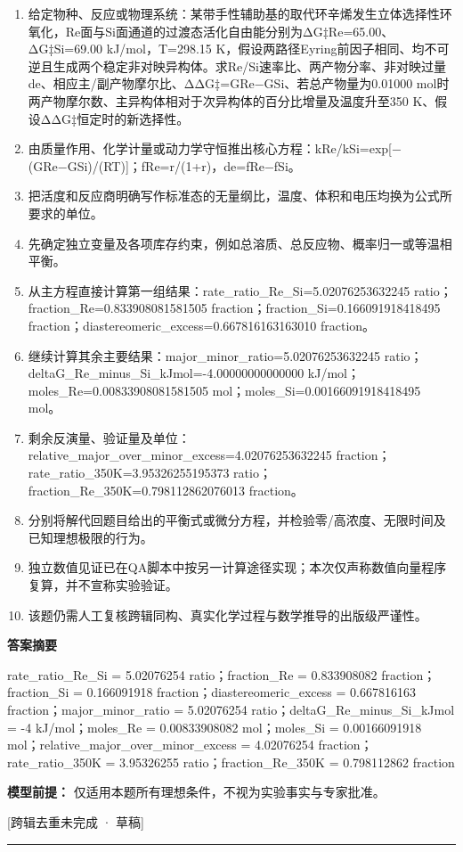 \documentclass[UTF8,11pt,a4paper]{ctexart}
\begin{document}
\begin{enumerate}
\item 给定物种、反应或物理系统：某带手性辅助基的取代环辛烯发生立体选择性环氧化，Re面与Si面通道的过渡态活化自由能分别为ΔG‡Re=65.00、ΔG‡Si=69.00 kJ/mol，T=298.15 K，假设两路径Eyring前因子相同、均不可逆且生成两个稳定非对映异构体。求Re/Si速率比、两产物分率、非对映过量de、相应主/副产物摩尔比、ΔΔG‡=GRe−GSi、若总产物量为0.01000 mol时两产物摩尔数、主异构体相对于次异构体的百分比增量及温度升至350 K、假设ΔΔG‡恒定时的新选择性。
\item 由质量作用、化学计量或动力学守恒推出核心方程：kRe/kSi=exp[−(GRe−GSi)/(RT)]；fRe=r/(1+r)，de=fRe−fSi。
\item 把活度和反应商明确写作标准态的无量纲比，温度、体积和电压均换为公式所要求的单位。
\item 先确定独立变量及各项库存约束，例如总溶质、总反应物、概率归一或等温相平衡。
\item 从主方程直接计算第一组结果：rate\_ratio\_Re\_Si=5.02076253632245 ratio；fraction\_Re=0.833908081581505 fraction；fraction\_Si=0.166091918418495 fraction；diastereomeric\_excess=0.667816163163010 fraction。
\item 继续计算其余主要结果：major\_minor\_ratio=5.02076253632245 ratio；deltaG\_Re\_minus\_Si\_kJmol=-4.00000000000000 kJ/mol；moles\_Re=0.00833908081581505 mol；moles\_Si=0.00166091918418495 mol。
\item 剩余反演量、验证量及单位：relative\_major\_over\_minor\_excess=4.02076253632245 fraction；rate\_ratio\_350K=3.95326255195373 ratio；fraction\_Re\_350K=0.798112862076013 fraction。
\item 分别将解代回题目给出的平衡式或微分方程，并检验零/高浓度、无限时间及已知理想极限的行为。
\item 独立数值见证已在QA脚本中按另一计算途径实现；本次仅声称数值向量程序复算，并不宣称实验验证。
\item 该题仍需人工复核跨辑同构、真实化学过程与数学推导的出版级严谨性。
\end{enumerate}
\noindent\textbf{答案摘要}\par
rate\_ratio\_Re\_Si = 5.02076254 ratio；fraction\_Re = 0.833908082 fraction；fraction\_Si = 0.166091918 fraction；diastereomeric\_excess = 0.667816163 fraction；major\_minor\_ratio = 5.02076254 ratio；deltaG\_Re\_minus\_Si\_kJmol = -4 kJ/mol；moles\_Re = 0.00833908082 mol；moles\_Si = 0.00166091918 mol；relative\_major\_over\_minor\_excess = 4.02076254 fraction；rate\_ratio\_350K = 3.95326255 ratio；fraction\_Re\_350K = 0.798112862 fraction\par
\noindent\textbf{模型前提：}
仅适用本题所有理想条件，不视为实验事实与专家批准。\par
\noindent\textcolor{red!65!black}{[跨辑去重未完成 · 草稿]} \par
\medskip\hrule\medskip
\end{document}
